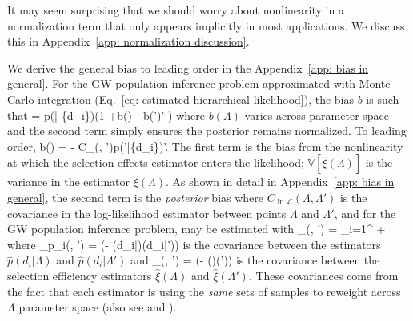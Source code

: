 It may seem surprising that we should worry about nonlinearity in a normalization term that only appears implicitly in most applications. We discuss this in Appendix~\ref{app: normalization discussion}.

We derive the general bias to leading order in the Appendix~\ref{app: bias in general}. For the \ac{GW} population inference problem approximated with Monte Carlo integration (Eq.~\ref{eq: estimated hierarchical likelihood}), the bias $b$ is such that
\beq
{} = p(\Lambda | \{d_i\})\left(1 +b(\Lambda) - \int b(\Lambda')\dd\Lambda' \right)
\eeq
where $b(\Lambda)$ varies across parameter space and the second term simply ensures the posterior remains normalized. To leading order, 
\beq
b(\Lambda) =  - \int C_{\ln{}}(\Lambda, \Lambda')p(\Lambda'|\{d_i\})\dd\Lambda'.
\label{eq: posterior bias}
\eeq
The first term is the bias from the nonlinearity at which the selection effects estimator enters the likelihood; $\mathbb{V}[\hat{\xi}(\Lambda)]$ is the variance in the estimator $\hat{\xi}(\Lambda)$. As shown in detail in Appendix~\ref{app: bias in general}, the second term is the \textit{posterior} bias where $C_{\ln\mathcal{L}}(\Lambda, \Lambda')$ is the covariance in the log-likelihood estimator between points $\Lambda$ and $\Lambda'$, and for the \ac{GW} population inference problem, may be estimated with
\beq
{}_{\ln{}}(\Lambda, \Lambda') = \sum_{i=1}^{\Nobs}
+ 
\label{eq: population covariance with selection}    
\eeq
where 
\beq
{}_{p_i}(\Lambda, \Lambda') = \left(\left[\frac{1}{\NPE}\sum_{j=1}^{\NPE}\frac{p(\theta_{ij}|\Lambda)}{\pi(\theta_{ij}|{\rm PE})}\frac{p(\theta_{ij}|\Lambda')}{\pi(\theta_{ij}|{\rm PE})}\right] - (d_i|\Lambda)(d_i|\Lambda')\right)
\label{eq: single event covariance estimator}
\eeq
is the covariance between the estimators $\hat{p}(d_i|\Lambda)$ and $\hat{p}(d_i|\Lambda')$ and
\beq
{}_{\xi}(\Lambda, \Lambda') = \left(\left[\frac{1}{\Ninj}\sum_{j=1}^{\Nfound}\frac{p(\theta_j|\Lambda)}{p(\theta_j|{\rm draw})}\frac{p(\theta_j|\Lambda')}{p(\theta_j|{\rm draw})}\right] - \hat{\xi}(\Lambda)\hat{\xi}(\Lambda')\right)
\label{eq: selection covariance estimator}
\eeq
is the covariance between the selection efficiency estimators $\hat{\xi}(\Lambda)$ and $\hat{\xi}(\Lambda')$.
These covariances come from the fact that each estimator is using the \textit{same} sets of samples to reweight across $\Lambda$ parameter space (also see \citet{Essick:2022ojx} and \citet{Talbot:2023pex}).

